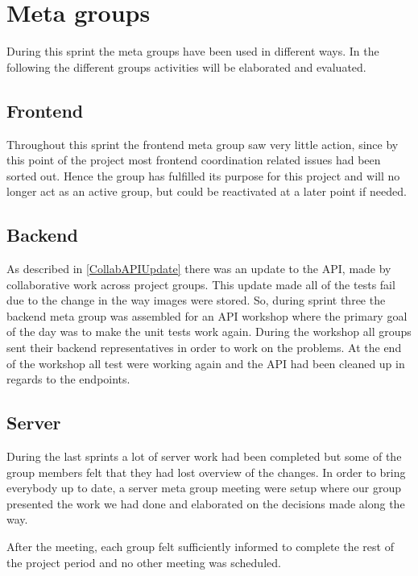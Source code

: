 \section{Meta groups}
During this sprint the meta groups have been used in different ways.
In the following the different groups activities will be elaborated and evaluated.

\subsection{Frontend}
Throughout this sprint the frontend meta group saw very little action, since by this point of the project most frontend coordination related issues had been sorted out.
Hence the group has fulfilled its purpose for this project and will no longer act as an active group, but could be reactivated at a later point if needed.

\subsection{Backend}
As described in \autoref{CollabAPIUpdate} there was an update to the API, made by collaborative work across project groups.
This update made all of the tests fail due to the change in the way images were stored.
So, during sprint three the backend meta group was assembled for an API workshop where the primary goal of the day was to make the unit tests work again.
During the workshop all groups sent their backend representatives in order to work on the problems.
At the end of the workshop all test were working again and the API had been cleaned up in regards to the endpoints.

\subsection{Server}
During the last sprints a lot of server work had been completed but some of the group members felt that they had lost overview of the changes.
In order to bring everybody up to date, a server meta group meeting were setup where our group presented the work we had done and elaborated on the decisions made along the way.

After the meeting, each group felt sufficiently informed to complete the rest of the project period and no other meeting was scheduled.
